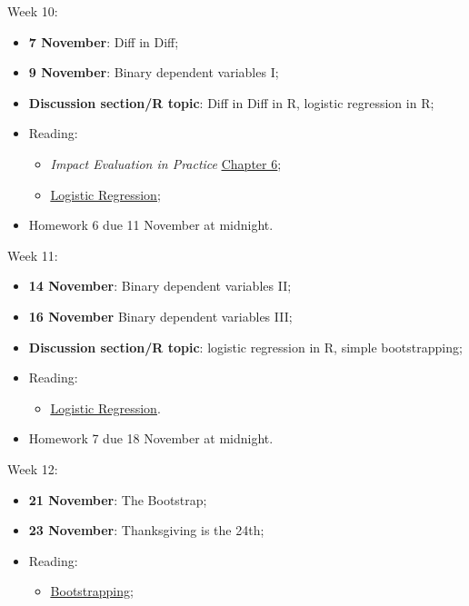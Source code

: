 \documentclass[12pt]{article}
\begin{document}
\noindent Week 10:
\begin{itemize}
\item \textbf{7 November}: Diff in Diff;
\item \textbf{9 November}: Binary dependent variables I;
\item \textbf{Discussion section/R topic}: Diff in Diff in R, logistic regression in R;
\item Reading:
\begin{itemize}
\item \textit{Impact Evaluation in Practice} \href{https://openknowledge.worldbank.org/handle/10986/25030}{\color{blue}\underline{Chapter 6}};
\item \href{https://cfss.uchicago.edu/notes/logistic-regression/}{\color{blue}\underline{Logistic Regression}};
\end{itemize}
\item Homework 6 due 11 November at midnight.
\end{itemize}

\noindent Week 11:
\begin{itemize}
\item \textbf{14 November}: Binary dependent variables II;
\item \textbf{16 November} Binary dependent variables III;
\item \textbf{Discussion section/R topic}: logistic regression in R, simple bootstrapping;
\item Reading:
\begin{itemize}
\item \href{https://cfss.uchicago.edu/notes/logistic-regression/}{\color{blue}\underline{Logistic Regression}}.
\end{itemize}
\item Homework 7 due 18 November at midnight.
\end{itemize}

\noindent Week 12:
\begin{itemize}
\item \textbf{21 November}: The Bootstrap;
\item \textbf{23 November}: Thanksgiving is the 24th;
\item Reading:
\begin{itemize}
\item \href{https://statisticsbyjim.com/hypothesis-testing/bootstrapping/}{\color{blue}\underline{Bootstrapping}};
\end{itemize}
\end{itemize}
\end{document}
